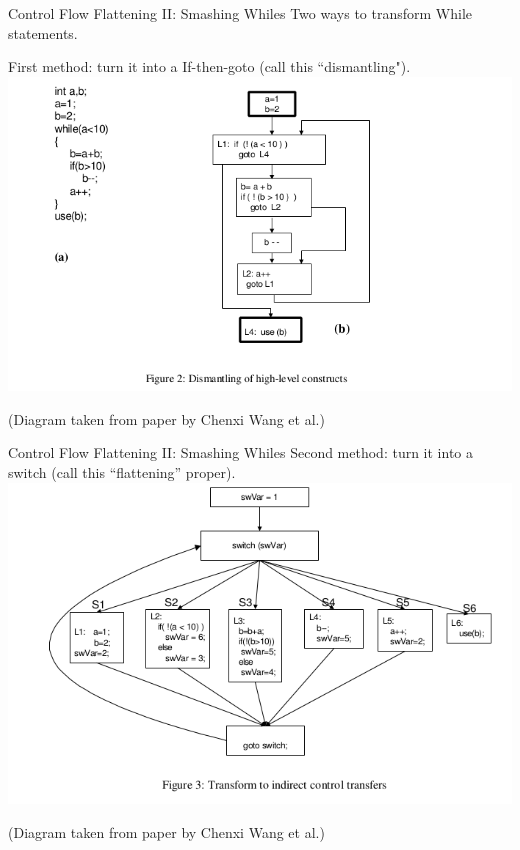 \documentclass[10pt,handout]{beamer}
\theoremstyle{plain}
\theoremstyle{definition}
\begin{document}
\begin{frame}{Control Flow Flattening II: Smashing Whiles}
Two ways to transform While statements.  \par First method: turn it into a If-then-goto (call this ``dismantling").
\includegraphics[scale=0.4]{WhileSmash}\par
(Diagram taken from paper by Chenxi Wang et al.)
\end{frame}


\begin{frame}{Control Flow Flattening II: Smashing Whiles}
Second method: turn it into a switch (call this ``flattening'' proper).
\includegraphics[scale=0.4]{WhileSmash2}\par
(Diagram taken from paper by Chenxi Wang et al.)
\end{frame}
\end{document}
